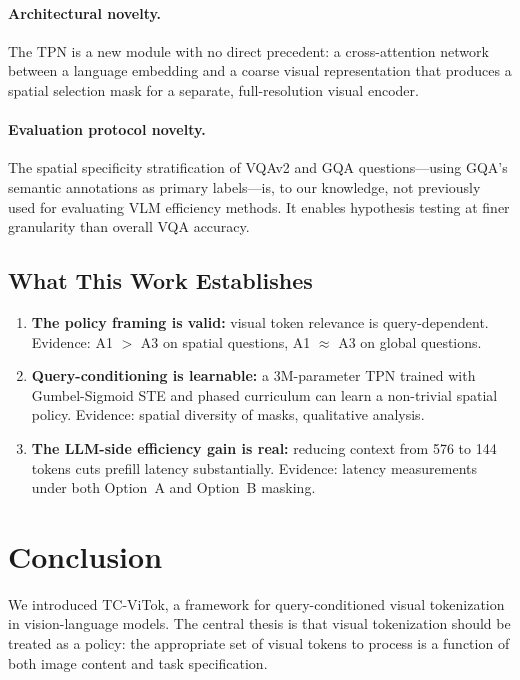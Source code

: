 \documentclass[12pt,a4paper]{article}
\begin{document}
\paragraph{Architectural novelty.}
The TPN is a new module with no direct precedent: a cross-attention network
between a language embedding and a coarse visual representation that produces a
spatial selection mask for a separate, full-resolution visual encoder.

\paragraph{Evaluation protocol novelty.}
The spatial specificity stratification of VQAv2 and GQA questions---using GQA's
semantic annotations as primary labels---is, to our knowledge, not previously
used for evaluating VLM efficiency methods. It enables hypothesis testing at
finer granularity than overall VQA accuracy.

\subsection{What This Work Establishes}

\begin{enumerate}[leftmargin=2em]
  \item \textbf{The policy framing is valid:} visual token relevance is
    query-dependent. Evidence: A1 $>$ A3 on spatial questions, A1 $\approx$ A3
    on global questions.
  \item \textbf{Query-conditioning is learnable:} a 3M-parameter TPN trained
    with Gumbel-Sigmoid STE and phased curriculum can learn a non-trivial spatial
    policy. Evidence: spatial diversity of masks, qualitative analysis.
  \item \textbf{The LLM-side efficiency gain is real:} reducing context from 576
    to 144 tokens cuts prefill latency substantially. Evidence: latency
    measurements under both Option~A and Option~B masking.
\end{enumerate}

\section{Conclusion}
\label{sec:conclusion}

We introduced TC-ViTok, a framework for query-conditioned visual tokenization
in vision-language models. The central thesis is that visual tokenization should
be treated as a policy: the appropriate set of visual tokens to process is a
function of both image content and task specification.
\end{document}
